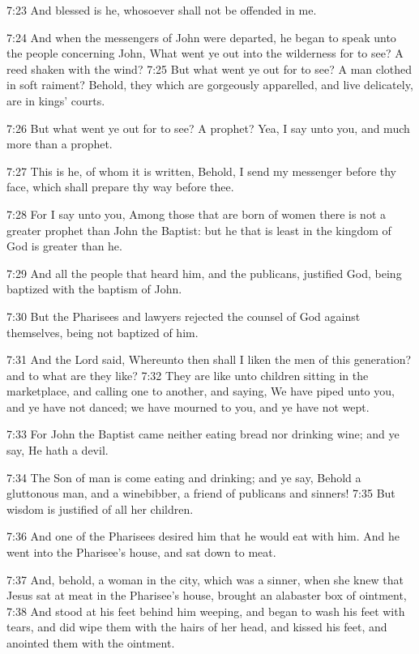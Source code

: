 7:23 And blessed is he, whosoever shall not be offended in me.

7:24 And when the messengers of John were departed, he began to speak unto the people concerning John, What went ye out into the wilderness for to see?  A reed shaken with the wind?  7:25 But what went ye out for to see? A man clothed in soft raiment?  Behold, they which are gorgeously apparelled, and live delicately, are in kings' courts.

7:26 But what went ye out for to see? A prophet? Yea, I say unto you, and much more than a prophet.

7:27 This is he, of whom it is written, Behold, I send my messenger before thy face, which shall prepare thy way before thee.

7:28 For I say unto you, Among those that are born of women there is not a greater prophet than John the Baptist: but he that is least in the kingdom of God is greater than he.

7:29 And all the people that heard him, and the publicans, justified God, being baptized with the baptism of John.

7:30 But the Pharisees and lawyers rejected the counsel of God against themselves, being not baptized of him.

7:31 And the Lord said, Whereunto then shall I liken the men of this generation? and to what are they like?  7:32 They are like unto children sitting in the marketplace, and calling one to another, and saying, We have piped unto you, and ye have not danced; we have mourned to you, and ye have not wept.

7:33 For John the Baptist came neither eating bread nor drinking wine; and ye say, He hath a devil.

7:34 The Son of man is come eating and drinking; and ye say, Behold a gluttonous man, and a winebibber, a friend of publicans and sinners!  7:35 But wisdom is justified of all her children.

7:36 And one of the Pharisees desired him that he would eat with him.  And he went into the Pharisee's house, and sat down to meat.

7:37 And, behold, a woman in the city, which was a sinner, when she knew that Jesus sat at meat in the Pharisee's house, brought an alabaster box of ointment, 7:38 And stood at his feet behind him weeping, and began to wash his feet with tears, and did wipe them with the hairs of her head, and kissed his feet, and anointed them with the ointment.


